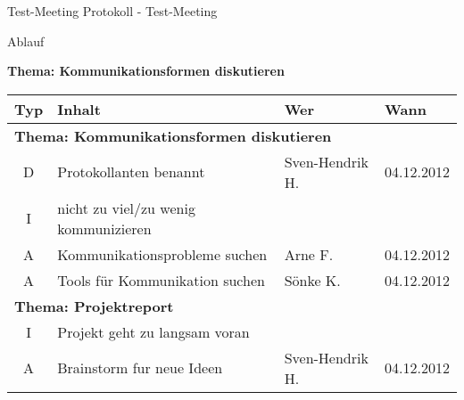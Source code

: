 \documentclass[t, 10pt]{beamer}
\begin{document}
\begin{frame}{Test-Meeting Protokoll - Test-Meeting}

\begin{block}{Ablauf}

\textbf{Thema: Kommunikationsformen diskutieren}
\begin{tabular}[t]{c|l|l|l}
Typ & Inhalt & Wer & Wann \\ \hline \hline
\multicolumn{4}{l}{\textbf{Thema: Kommunikationsformen diskutieren}} \\ \hline
D   & Protokollanten benannt & Sven-Hendrik H. & 04.12.2012 \\ \hline
I   & nicht zu viel/zu wenig kommunizieren \\ \hline
A   & Kommunikationsprobleme suchen & Arne F. & 04.12.2012 \\ \hline
A   & Tools für Kommunikation suchen & Sönke K. & 04.12.2012 \\ \hline
\multicolumn{4}{l}{\textbf{Thema: Projektreport}} \\ \hline
I   & Projekt geht zu langsam voran \\ \hline
A   & Brainstorm fur neue Ideen & Sven-Hendrik H. & 04.12.2012
\end{tabular}
\end{block}
\end{frame}
\end{document}

